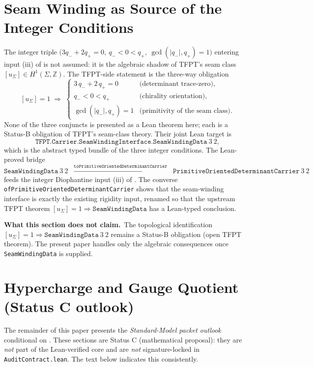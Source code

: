 \section{Seam Winding as Source of the Integer Conditions}
\label{sec:seam-winding}

The integer triple $\bigl(3q_-+2q_+=0,\ q_-<0<q_+,\ \gcd(|q_-|,q_+)=1\bigr)$ entering input
(iii) of  is not assumed: it is the algebraic shadow of TFPT's seam
class $[u_\Sigma]\in H^1(\Sigma,\mathbb Z)$. The TFPT-side statement is the three-way obligation
\[
[u_\Sigma]=1
\;\Longrightarrow\;
\begin{cases}
3\,q_-+2\,q_+ = 0 & \text{(determinant trace-zero)},\\
q_- < 0 < q_+ & \text{(chirality orientation)},\\
\gcd(|q_-|, q_+) = 1 & \text{(primitivity of the seam class)}.
\end{cases}
\]
None of the three conjuncts is presented as a Lean theorem here; each is a Status-B obligation
of TFPT's seam-class theory. Their joint Lean target is
\[
\texttt{TFPT.Carrier.SeamWindingInterface.SeamWindingData}\ 3\ 2,
\]
which is the abstract typed bundle of the three integer conditions. The Lean-proved bridge
\[
\texttt{SeamWindingData}\ 3\ 2
\;\;\xrightarrow{\texttt{toPrimitiveOrientedDeterminantCarrier}}\;\;
\texttt{PrimitiveOrientedDeterminantCarrier}\ 3\ 2
\]
feeds the integer Diophantine input (iii) of . The converse
\texttt{ofPrimitiveOrientedDeterminantCarrier} shows that the seam-winding interface is exactly
the existing rigidity input, renamed so that the upstream TFPT theorem
$[u_\Sigma]=1 \Rightarrow \texttt{SeamWindingData}$ has a Lean-typed conclusion.

\noindent
\textbf{What this section does not claim.}\ The topological identification
$[u_\Sigma]=1 \Rightarrow \texttt{SeamWindingData}\ 3\ 2$ remains a Status-B obligation
(open TFPT theorem). The present paper handles only the algebraic consequences once
\texttt{SeamWindingData} is supplied.

\section{Hypercharge and Gauge Quotient (Status C outlook)}
\label{sec:gauge-outlook}

\begin{tfptwarningbox}
The remainder of this paper presents the \emph{Standard-Model
packet outlook} conditional on . These
sections are Status C (mathematical proposal): they are
\emph{not} part of the Lean-verified core and are
\emph{not} signature-locked in \texttt{AuditContract.lean}.
The text below indicates this consistently.
\end{tfptwarningbox}

